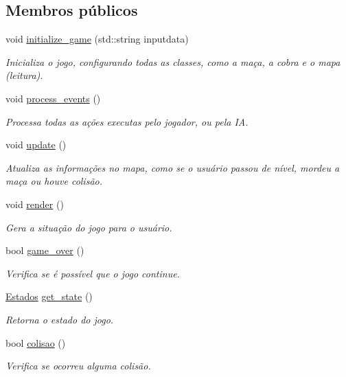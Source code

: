 \subsection*{Membros públicos}
\begin{DoxyCompactItemize}
\item 
void \hyperlink{classSnazeGame_ac104ea6197c75780b2e0f2da3a293caa}{initialize\+\_\+game} (std\+::string inputdata)
\begin{DoxyCompactList}\small\item\em Inicializa o jogo, configurando todas as classes, como a maça, a cobra e o mapa (leitura). \end{DoxyCompactList}\item 
void \hyperlink{classSnazeGame_a8a9f2f626de17c2e592a579b15e1592f}{process\+\_\+events} ()
\begin{DoxyCompactList}\small\item\em Processa todas as ações executas pelo jogador, ou pela IA. \end{DoxyCompactList}\item 
void \hyperlink{classSnazeGame_a288103ac611e57f980d595bca35e399a}{update} ()
\begin{DoxyCompactList}\small\item\em Atualiza as informações no mapa, como se o usuário passou de nível, mordeu a maça ou houve colisão. \end{DoxyCompactList}\item 
void \hyperlink{classSnazeGame_a67f9c90252d094a048b1cda89f36b3a0}{render} ()
\begin{DoxyCompactList}\small\item\em Gera a situação do jogo para o usuário. \end{DoxyCompactList}\item 
bool \hyperlink{classSnazeGame_a5692397592a88a256071660b8bfe5231}{game\+\_\+over} ()
\begin{DoxyCompactList}\small\item\em Verifica se é possível que o jogo continue. \end{DoxyCompactList}\item 
\hyperlink{classSnazeGame_a10ea6cb420042fdbfcade4f0261af5c1}{Estados} \hyperlink{classSnazeGame_a9b3002a7863a8c3f6fb5d6689ebf400a}{get\+\_\+state} ()
\begin{DoxyCompactList}\small\item\em Retorna o estado do jogo. \end{DoxyCompactList}\item 
bool \hyperlink{classSnazeGame_a829f1052a228d6f8bc31fb064695389e}{colisao} ()
\begin{DoxyCompactList}\small\item\em Verifica se ocorreu alguma colisão. \end{DoxyCompactList}\end{DoxyCompactItemize}
